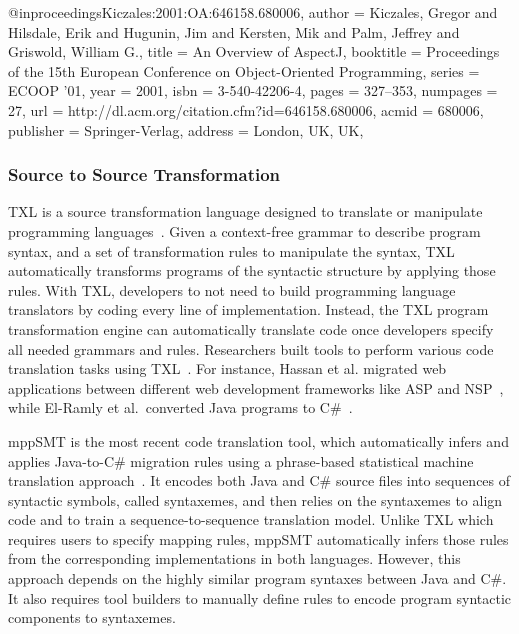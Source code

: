 \documentclass[runningheads,a4paper]{llncs}
\begin{document}
@inproceedings{Kiczales:2001:OA:646158.680006,
 author = {Kiczales, Gregor and Hilsdale, Erik and Hugunin, Jim and Kersten, Mik and Palm, Jeffrey and Griswold, William G.},
 title = {An Overview of AspectJ},
 booktitle = {Proceedings of the 15th European Conference on Object-Oriented Programming},
 series = {ECOOP '01},
 year = {2001},
 isbn = {3-540-42206-4},
 pages = {327--353},
 numpages = {27},
 url = {http://dl.acm.org/citation.cfm?id=646158.680006},
 acmid = {680006},
 publisher = {Springer-Verlag},
 address = {London, UK, UK},
} 

\subsubsection{Source to Source Transformation} 

TXL is a source transformation language designed to translate or manipulate programming languages~\cite{Cordy2006}. Given a context-free grammar to describe program syntax, and a set of transformation rules to manipulate the syntax, TXL automatically transforms programs of the syntactic structure by applying those rules. With TXL, developers to not need to build programming language translators by coding every line of implementation. Instead, the TXL program transformation engine can automatically translate code once developers specify all needed grammars and rules. Researchers built tools to perform various code translation tasks using TXL~\cite{Chu:08,Hassan:2005,El-Ramly:2006,Tonella:04}. For instance, Hassan et al. migrated web applications between different web development frameworks like ASP and NSP~\cite{Hassan:2005}, while El-Ramly et al.~converted Java programs to C\#~\cite{El-Ramly:2006}. 


mppSMT is the most recent code translation tool, which automatically infers and applies Java-to-C\# migration rules using a phrase-based statistical machine translation approach~\cite{Nguyen:15}. It encodes both Java and C\# source files into sequences of syntactic symbols, called syntaxemes, and then relies on the syntaxemes to align code and to train a sequence-to-sequence translation model. 
Unlike TXL which requires users to specify mapping rules, mppSMT automatically infers those rules from the corresponding implementations in both languages. 
However, this approach depends on the highly similar program syntaxes between Java and C\#. It also requires tool builders to manually define rules to encode program syntactic components to syntaxemes. 
\end{document}
